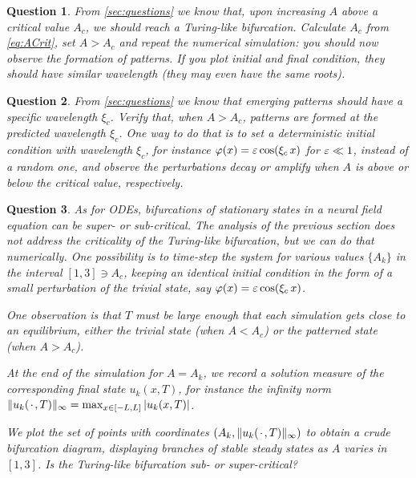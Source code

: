 \documentclass[a4paper]{siamonline220329}
\theoremstyle{plain}
\newtheorem{question}{Question}
\begin{document}
\begin{question} 
  From \cref{sec:questions} we know that, upon increasing $A$ above a critical value
  $A_c$, we should reach a Turing-like bifurcation. Calculate $A_c$ from
  \cref{eq:ACrit}, set $A > A_c$ and repeat the numerical simulation: you should now
  observe the formation of patterns. If you plot initial and final condition, they
  should have similar wavelength (they may even have the same roots).
\end{question}

\begin{question} 
  From \cref{sec:questions} we know that emerging patterns should have a specific wavelength
  $\xi_c$. Verify that, when $A > A_c$, patterns are formed at the predicted
  wavelength $\xi_c$. One way to do that is to set a deterministic initial condition with
  wavelength $\xi_c$, for instance $\varphi(x) = \varepsilon \cos(\xi_c\, x)$ for $\varepsilon \ll 1$, instead of a random
  one, and observe the perturbations decay or amplify when $A$ is above or below the
  critical value, respectively.
\end{question}

\begin{question} 
  As for ODEs, bifurcations of stationary states in a neural field equation can be
  super- or sub-critical. The analysis of the previous section does not address the
  criticality of the Turing-like bifurcation, but we can do that numerically. One
  possibility is to time-step the system for various values $\{A_k\}$ in the
  interval $[1,3] \ni A_c$, keeping an identical initial condition in the form of a small
  perturbation of the trivial state, say $\varphi(x) = \varepsilon \cos(\xi_c \, x)$. 

  One observation is that $T$ must be large enough that each simulation gets close to
  an equilibrium, either the trivial state (when $A < A_c$) or the patterned state
  (when $A > A_c$).

  At the end of the simulation for $A = A_k$, we record a solution measure of the
  corresponding final state $u_k(x,T)$, for instance the infinity norm  $\|
  u_k({\mkern 2mu\cdot\mkern 2mu},T) \|_{\infty} = \max_{x \in [-L,L]} | u_k(x,T) |$. 

  We plot the set of points with coordinates $(A_k, \| u_k({\mkern 2mu\cdot\mkern 2mu}, T) \|_{\infty})$
  to obtain a crude bifurcation diagram, displaying branches of stable steady states
  as $A$ varies in $[1,3]$. Is the Turing-like bifurcation sub- or super-critical?
\end{question}
\end{document}
